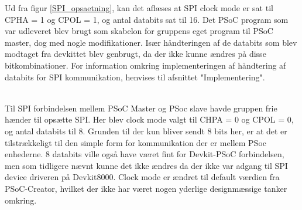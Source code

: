 Ud fra figur \ref{SPI_opsaetning}, kan det aflæses at SPI clock mode er sat til CPHA = 1 og CPOL = 1, og antal databits sat til 16. Det PSoC program som var udleveret blev brugt
som skabelon for gruppens eget program til PSoC master, dog med nogle modifikationer. Især håndteringen af de databits som blev modtaget fra devkittet blev 
genbrugt, da der ikke kunne ændres på disse bitkombinationer. For information omkring implementeringen af håndtering af databits for SPI kommunikation, 
henvises til afsnittet "Implementering".

\\
Til SPI forbindelsen mellem PSoC Master og PSoc slave havde gruppen frie hænder til opsætte SPI. Her blev clock mode valgt til CHPA = 0 og CPOL = 0, og 
antal databits til 8. Grunden til der kun bliver sendt 8 bits her, er at det er tilstrækkeligt til den simple form for kommunikation der er mellem PSoc enhederne.
8 databits ville også have været fint for Devkit-PSoC forbindelsen, men som tidligere nævnt kunne det ikke ændres da der ikke var adgang til SPI device driveren
på Devkit8000. Clock mode er ændret til default værdien fra PSoC-Creator, hvilket der ikke har været nogen yderlige designmæssige tanker omkring.